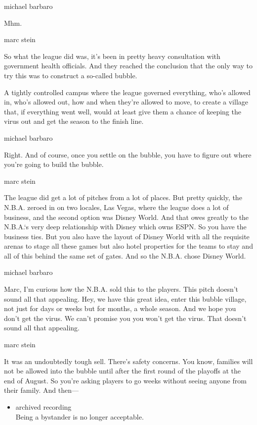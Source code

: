 michael barbaro

Mhm.

marc stein

So what the league did was, it's been in pretty heavy consultation with
government health officials. And they reached the conclusion that the
only way to try this was to construct a so-called bubble.

A tightly controlled campus where the league governed everything, who's
allowed in, who's allowed out, how and when they're allowed to move, to
create a village that, if everything went well, would at least give them
a chance of keeping the virus out and get the season to the finish line.

michael barbaro

Right. And of course, once you settle on the bubble, you have to figure
out where you're going to build the bubble.

marc stein

The league did get a lot of pitches from a lot of places. But pretty
quickly, the N.B.A. zeroed in on two locales, Las Vegas, where the
league does a lot of business, and the second option was Disney World.
And that owes greatly to the N.B.A.`s very deep relationship with Disney
which owns ESPN. So you have the business ties. But you also have the
layout of Disney World with all the requisite arenas to stage all these
games but also hotel properties for the teams to stay and all of this
behind the same set of gates. And so the N.B.A. chose Disney World.

michael barbaro

Marc, I'm curious how the N.B.A. sold this to the players. This pitch
doesn't sound all that appealing. Hey, we have this great idea, enter
this bubble village, not just for days or weeks but for months, a whole
season. And we hope you don't get the virus. We can't promise you you
won't get the virus. That doesn't sound all that appealing.

marc stein

It was an undoubtedly tough sell. There's safety concerns. You know,
families will not be allowed into the bubble until after the first round
of the playoffs at the end of August. So you're asking players to go
weeks without seeing anyone from their family. And then---

\begin{itemize}
\tightlist
\item
  archived recording\\
  Being a bystander is no longer acceptable.
\end{itemize}

